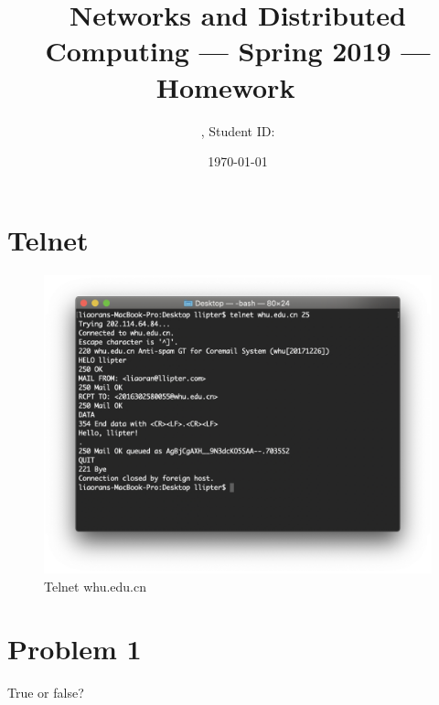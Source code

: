 \documentclass[11pt]{article}
\title{\Large Networks and Distributed Computing --- Spring 2019 --- Homework \Homework\ }
\author{\Name, Student ID: \SID}
\date{\today}
\begin{document}
\maketitle

\section{Telnet}

\begin{figure}[h]
\centering
\includegraphics[width=1\textwidth]{telnet.png}
\caption{\label{fig:telnet}Telnet whu.edu.cn}
\end{figure}

\newpage
\section{Problem 1}

True or false?
\end{document}
